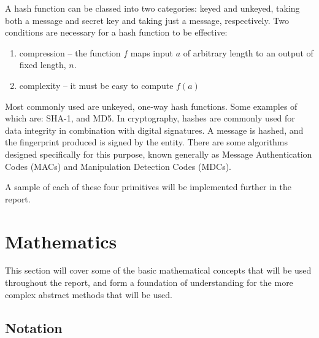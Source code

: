 A hash function can be classed into two categories: keyed and unkeyed, taking both a message and secret key and taking just a message, respectively. Two conditions are necessary for a hash function to be effective:

\begin{enumerate}
	\item compression -- the function $f$ maps input $a$ of arbitrary length to an output of fixed length, $n$.
	\item complexity -- it must be easy to compute $f(a)$
\end{enumerate}

Most commonly used are unkeyed, one-way hash functions. Some examples of which are: SHA-1, and MD5. In cryptography, hashes are commonly used for data integrity in combination with digital signatures. A message is hashed, and the fingerprint produced is signed by the entity. There are some algorithms designed specifically for this purpose, known generally as Message Authentication Codes (MACs) and Manipulation Detection Codes (MDCs).

A sample of each of these four primitives will be implemented further in the report.

\section{Mathematics}
\newtheorem{mathdef}{Definition}[section]
\newtheorem{mathexample}{Example}[section]
\newtheorem{mathfact}{Fact}[section]

This section will cover some of the basic mathematical concepts that will be used throughout the report, and form a foundation of understanding for the more complex abstract methods that will be used.

\subsection{Notation}

